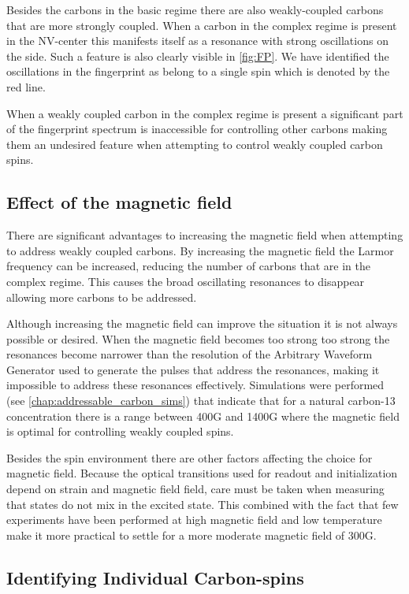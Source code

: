 Besides the carbons in the basic regime there are also weakly-coupled carbons that are more strongly coupled.
When a carbon in the complex regime is present in the NV-center this manifests itself as a resonance with strong oscillations on the side. Such a feature is also clearly visible in \cref{fig:FP}. We have identified the oscillations in the fingerprint as belong to a single spin which is denoted by the red line.

When a weakly coupled carbon in the complex regime is present a significant part of the fingerprint spectrum is inaccessible for controlling other carbons making them an undesired feature when attempting to control weakly coupled carbon spins.


\subsection{Effect of the magnetic field}

There are significant advantages to increasing the magnetic field when attempting to address weakly coupled carbons.
By increasing the magnetic field the Larmor frequency can be increased, reducing the number of carbons that are in the complex regime.
This causes the broad oscillating resonances to disappear allowing more carbons to be addressed.

Although increasing the magnetic field can improve the situation it is not always possible or desired.
When the magnetic field becomes too strong too strong the resonances become narrower than the resolution of the Arbitrary Waveform Generator used to generate the pulses that address the resonances, making it impossible to address these resonances effectively.
Simulations were performed (see \cref{chap:addressable_carbon_sims}) that indicate that for a natural carbon-13 concentration there is a range between 400G and 1400G where the magnetic field is optimal for controlling weakly coupled spins.

Besides the spin environment there are other factors affecting the choice for magnetic field.
Because the optical transitions used for readout and initialization depend on strain and magnetic field field\citep{Hensen2011MeasurementBased}, care must be taken when measuring that states do not mix in the excited state.
This combined with the fact that few experiments have been performed at high magnetic field and low temperature make it more practical to settle for a more moderate magnetic field of 300G.

\subsection{Identifying Individual Carbon-spins}

